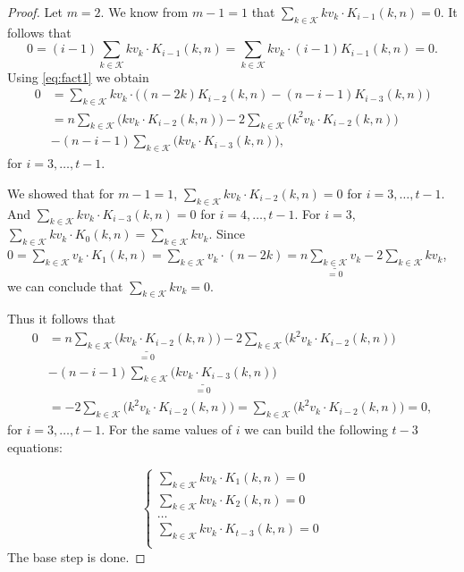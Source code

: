 \begin{proof}
    Let $m = 2$. We know from $m -1 = 1$ that $\sum_{k \in \mathcal{K}} kv_k \cdot K_{i-1}(k, n) = 0$. It follows that
    $$
    0 = (i-1)\sum_{k \in \mathcal{K}} kv_k \cdot K_{i-1}(k, n) = \sum_{k \in \mathcal{K}} kv_k \cdot (i-1)K_{i-1}(k, n) = 0.
    $$
    Using \cref{eq:fact1} we obtain
    \begin{equation*}
    \begin{split}
        0 &= \sum_{k \in \mathcal{K}} kv_k \cdot \Big( (n - 2k)K_{i-2}(k, n) - (n - i - 1)K_{i-3}(k, n) \Big)\\
        & = n \sum_{k \in \mathcal{K}} \Big( kv_k \cdot K_{i-2}(k, n) \Big) - 2\sum_{k \in \mathcal{K}} \Big( k^2v_k \cdot K_{i-2}(k, n) \Big)\\& - (n - i - 1)\sum_{k \in \mathcal{K}} \Big( kv_k \cdot K_{i-3}(k, n) \Big),
    \end{split}
    \end{equation*}
    for $i = 3, \ldots, t-1$.

    We showed that for $m - 1= 1$, $\sum_{k \in \mathcal{K}} kv_k \cdot K_{i-2}(k,n) = 0$ for $i = 3, \ldots, t-1$. And $\sum_{k \in \mathcal{K}} kv_k \cdot K_{i-3}(k,n) = 0$ for $i = 4, \ldots, t-1$. For $i = 3$, $\sum_{k \in \mathcal{K}} kv_k \cdot K_0(k, n) = \sum_{k \in \mathcal{K}} kv_k$. Since $0 = \sum_{k \in \mathcal{K}} v_k \cdot K_1(k, n) = \sum_{k \in \mathcal{K}} v_k \cdot(n - 2k) = n\underset{=0}{\underline{\sum_{k \in \mathcal{K}}v_k}} -2\sum_{k \in \mathcal{K}}kv_k$, we can conclude that $\sum_{k \in \mathcal{K}}kv_k = 0$.

    Thus it follows that
    \begin{equation*}
        \begin{split}
            0 &= n \underset{=0}{\underline{\sum_{k \in \mathcal{K}} \Big( kv_k \cdot K_{i-2}(k, n) \Big)}} - 2\sum_{k \in \mathcal{K}} \Big( k^2v_k \cdot K_{i-2}(k, n) \Big)\\& - (n - i - 1)\underset{=0}{\underline{\sum_{k \in \mathcal{K}} \Big( kv_k \cdot K_{i-3}(k, n) \Big)}}\\
            &= - 2\sum_{k \in \mathcal{K}} \Big( k^2v_k \cdot K_{i-2}(k, n) \Big) = \sum_{k \in \mathcal{K}} \Big( k^2v_k \cdot K_{i-2}(k, n) \Big) = 0,
        \end{split}
    \end{equation*}
    for $i = 3, \ldots, t-1$. For the same values of $i$ we can build the following $t-3$ equations:

    \begin{equation*}
        \begin{cases}
            \sum_{k \in \mathcal{K}} kv_k \cdot K_1(k, n) = 0\\
            \sum_{k \in \mathcal{K}} kv_k \cdot K_2(k, n) = 0\\
            \ldots\\
            \sum_{k \in \mathcal{K}} kv_k \cdot K_{t-3}(k, n) = 0\\
        \end{cases}
    \end{equation*}
    The base step is done.


\end{proof}
